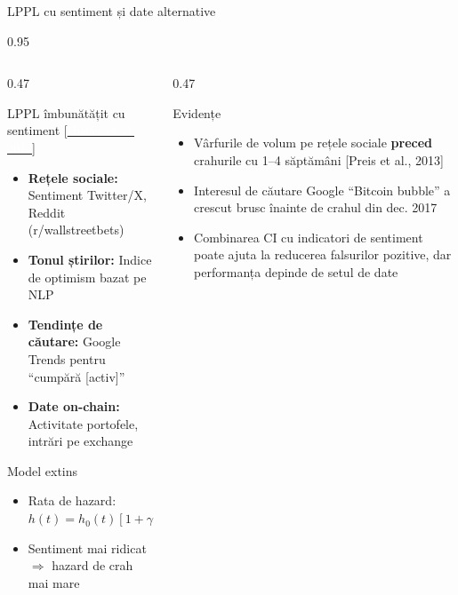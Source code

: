 \documentclass[9pt, aspectratio=169, t]{beamer}
\begin{document}
\begin{frame}{LPPL cu sentiment și date alternative}
    \begin{cminipage}{0.95\textwidth}
    {\scriptsize
    \begin{columns}[T]
        \begin{column}{0.47\textwidth}
            \begin{block}{LPPL îmbunătățit cu sentiment {\scriptsize[\href{https://doi.org/10.1016/j.jebo.2013.06.005}{\textcolor{white}{Hüsler et al., 2013}}]}}
                \begin{itemize}\setlength{\itemsep}{0pt}
                    \item \textbf{Rețele sociale:} Sentiment Twitter/X, Reddit (r/wallstreetbets)
                    \item \textbf{Tonul știrilor:} Indice de optimism bazat pe NLP
                    \item \textbf{Tendințe de căutare:} Google Trends pentru ``cumpără [activ]''
                    \item \textbf{Date on-chain:} Activitate portofele, intrări pe exchange
                \end{itemize}
            \end{block}
            \vspace{-2mm}
            \begin{exampleblock}{Model extins}
                \begin{itemize}\setlength{\itemsep}{0pt}
                    \item Rata de hazard: $h(t) = h_0(t)[1 + \gamma \cdot \text{Sent}(t)]$
                    \item Sentiment mai ridicat $\Rightarrow$ hazard de crah mai mare
                \end{itemize}
            \end{exampleblock}
        \end{column}
        \begin{column}{0.47\textwidth}
            \begin{exampleblock}{Evidențe}
                \begin{itemize}\setlength{\itemsep}{0pt}
                    \item Vârfurile de volum pe rețele sociale \textbf{preced} crahurile cu 1--4 săptămâni [Preis et al., 2013]
                    \item Interesul de căutare Google ``Bitcoin bubble'' a crescut brusc înainte de crahul din dec. 2017
                    \item Combinarea CI cu indicatori de sentiment poate ajuta la reducerea falsurilor pozitive, dar performanța depinde de setul de date

\end{itemize}
\end{exampleblock}
\end{column}
\end{columns}}
\end{cminipage}
\end{frame}
\end{document}
